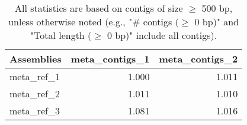 \documentclass[12pt,a4paper]{article}
\begin{document}
\begin{table}[ht]
\begin{center}
\caption{All statistics are based on contigs of size $\geq$ 500 bp, unless otherwise noted (e.g., "\# contigs ($\geq$ 0 bp)" and "Total length ($\geq$ 0 bp)" include all contigs).}
\begin{tabular}{|l*{2}{|r}|}
\hline
Assemblies & meta\_contigs\_1 & meta\_contigs\_2 \\ \hline
meta\_ref\_1 & 1.000 & 1.011 \\ \hline
meta\_ref\_2 & 1.011 & 1.010 \\ \hline
meta\_ref\_3 & 1.081 & 1.016 \\ \hline
\end{tabular}
\end{center}
\end{table}
\end{document}
